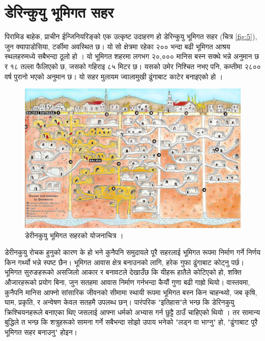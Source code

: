 \documentclass[10pt,twocolumn,letterpaper]{article}
\begin{document}
\section{डेरिन्कुयु भूमिगत सहर}

पिरामिड बाहेक, प्राचीन ईन्जिनियरिङ्को एक उत्कृष्ट उदाहरण हो डेरिन्कुयु भूमिगत सहर (चित्र \ref{fig:5}), जुन क्यापाडोसिया, टर्कीमा अवस्थित छ। यो सो क्षेत्रमा रहेका २०० भन्दा बढी भूमिगत आश्रय स्थलहरुमध्ये सबैभन्दा ठूलो हो \cite{54}। यो भूमिगत शहरमा लगभग २०,००० मानिस बस्न सक्थे भन्ने अनुमान छ र १८ तल्ला फैलिएको छ, जसको गहिराइ ८५ मिटर छ। यसको उमेर निश्चित नभए पनि, कम्तीमा २८०० वर्ष पुरानो भएको अनुमान छ। यो सहर मुलायम ज्वालामुखी ढुंगाबाट काटेर बनाइएको हो \cite{52, 53}।

\begin{figure}[b]
\begin{center}

\includegraphics[width=1\linewidth]{derinkuyu.jpeg}
\end{center}
   \caption{डेरीनकुयु भूमिगत सहरको योजनाचित्र \cite{56}।}
\label{fig:5}
\label{fig:onecol}
\end{figure}

डेरीनकुयु रोचक हुनुको कारण के हो भने कुनैपनि समुदायले पूरै सहरलाई भूमिगत रूपमा निर्माण गर्ने निर्णय किन गर्थ्यो भन्ने स्पष्ट छैन। भूमिगत आवास क्षेत्र बनाउनको लागि, हरेक गुफा ढुंगाबाट कोट्नु पर्छ। भूमिगत सुरुङहरूको असजिलो आकार र बनावटले देखाउँछ कि यीहरू हातैले कोटिएको हो, शक्ति औजारहरूको प्रयोग बिना, जुन सतहमा आवास निर्माण गर्नभन्दा कैयौं गुणा बढी गाह्रो थियो। वास्तवमा, कुनैपनि मानिस आफ्नो सांसारिक जीवनको सीमामा स्थायी रूपमा भूमिगत बस्न किन चाहन्थ्यो, जब कृषि, घाम, प्रकृति, र अन्वेषण केवल सतहमै उपलब्ध छन्। पारंपरिक "इतिहास"ले भन्छ कि डेरिनकुयु क्रिश्चियनहरूले बनाएका थिए जसलाई आफ्ना धर्मको अभ्यास गर्न छुट्टै ठाउँ चाहिएको थियो \cite{53}। तर सामान्य बुद्धिले त भन्छ कि शत्रुहरूको सामना गर्ने सबैभन्दा सोझो उपाय भनेको "लड्न वा भाग्नु" हो, "ढुंगाबाट पूरै भूमिगत सहर बनाउनु" होइन।
\end{document}
